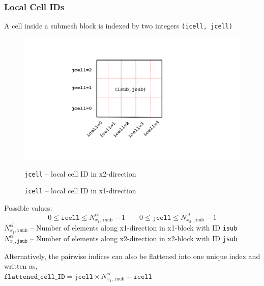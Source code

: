 \documentclass[a4paper,12pt]{article}
\begin{document}
\subsubsection{Local Cell IDs}
A cell inside a submesh block is indexed by two integers \texttt{(icell, jcell)}
\begin{figure}[H]
	\centering
	\includegraphics[trim=170 100 200 100,clip,scale=0.35]{figures/local_cell_ID.png}
	\caption{\texttt{icell} -- local cell ID in x1-direction}{\texttt{jcell} -- local cell ID in x2-direction}			
\end{figure}
\noindent Possible values:
\begin{equation*}
0 \le \texttt{icell} \le N^{el}_{x_1,\texttt{isub}}-1 \qquad 0 \le \texttt{jcell} \le N^{el}_{x_2,\texttt{jsub}}-1
\end{equation*}
$N^{el}_{x_1,\texttt{isub}}$ -- Number of elements along x1-direction in x1-block with ID \texttt{isub}\\
$N^{el}_{x_2,\texttt{jsub}}$ -- Number of elements along x2-direction in x2-block with ID \texttt{jsub}

Alternatively, the pairwise indices can also be flattened into one unique index and written as,\\
$\texttt{flattened\_cell\_ID} = \texttt{jcell} \times N^{el}_{x_1,\texttt{isub}} + \texttt{icell}$
\end{document}

